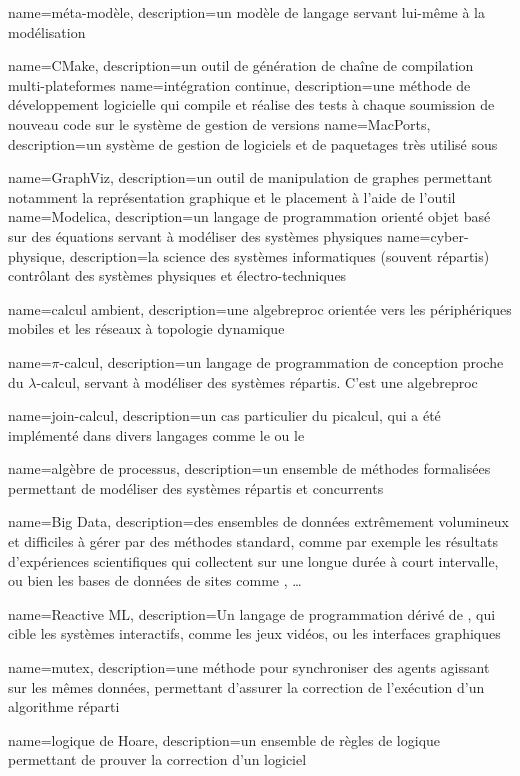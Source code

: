 {
	name={méta-modèle},
	description={un modèle de langage servant lui-même à la modélisation}	
}

{
	name={CMake}, 
	description={un outil de génération de chaîne de compilation multi-plateformes}
}
{
	name={intégration continue},
	description={une méthode de développement logicielle qui compile et réalise des tests à chaque soumission de nouveau code sur le système de gestion de versions}
}
{
	name=MacPorts, 
	description={un système de gestion de logiciels et de paquetages très utilisé sous }
}

{
	name=GraphViz, 
	description={un outil de manipulation de graphes permettant notamment la représentation graphique et le placement à l'aide de l'outil }
}
{
	name=Modelica, 
	description={un langage de programmation orienté objet basé sur des équations servant à modéliser des systèmes physiques}
}
{
	name=cyber-physique, 
	description={la science des systèmes informatiques (souvent répartis) contrôlant des systèmes physiques et électro-techniques}
}

{
	name={calcul ambient}, 
	description={une \gls{algebreproc} orientée vers les périphériques mobiles et les réseaux à topologie dynamique}
}

{
	name={$\pi$-calcul},
	description={un langage de programmation de conception proche du $\lambda$-calcul, servant à modéliser des systèmes répartis. C'est une \gls{algebreproc}}	
}

{
	name={join-calcul}, 
	description={un cas particulier du \gls{picalcul}, qui a été implémenté dans divers langages comme le  ou le }
}

{
	name={algèbre de processus},
	description={un ensemble de méthodes formalisées permettant de modéliser des systèmes répartis et concurrents}
}

{
	name={Big Data},
	description={des ensembles de données extrêmement volumineux et difficiles à gérer par des méthodes standard, comme par exemple les résultats d'expériences scientifiques qui collectent sur une longue durée à court intervalle, ou bien les bases de données de sites comme , \dots}
}

{
	name={Reactive ML},
	description={Un langage de programmation dérivé de , qui cible les systèmes interactifs, comme les jeux vidéos, ou les interfaces graphiques}	
}

{
	name=mutex,
	description={une méthode pour synchroniser des agents agissant sur les mêmes données, permettant d'assurer la correction de l'exécution d'un algorithme réparti}	
}

{
	name={logique de Hoare},
	description={un ensemble de règles de logique permettant de prouver la correction d'un logiciel}
}